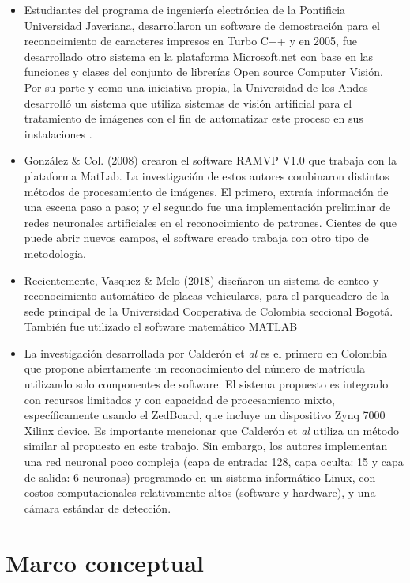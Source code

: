 \begin{itemize}
    \item Estudiantes del programa de ingeniería electrónica de la Pontificia Universidad Javeriana, desarrollaron un software de demostración para el reconocimiento de caracteres impresos en Turbo C++ \cite{TrabajodeGrado2}y en 2005, fue desarrollado otro sistema en la plataforma Microsoft.net con base en las funciones y clases del conjunto de librerías Open source Computer Visión\cite{TrabajodeGrado}. Por su parte y como una iniciativa propia, la Universidad de los Andes desarrolló un sistema que utiliza sistemas de visión artificial para el tratamiento de imágenes con el fin de automatizar este proceso en sus instalaciones \cite{Uniandes}.
    \item González \& Col. (2008) crearon el software RAMVP V1.0 que trabaja con la plataforma MatLab. La investigación de estos autores combinaron distintos métodos de procesamiento de imágenes. El primero, extraía información de una escena paso a paso; y el segundo fue  una implementación preliminar de redes neuronales artificiales en el reconocimiento de patrones. Cientes de que puede abrir nuevos campos, el software creado trabaja con otro tipo de metodología\cite{trabajodegrado3}.
    \item Recientemente, Vasquez \& Melo (2018) diseñaron un sistema de conteo y reconocimiento automático de placas vehiculares, para el parqueadero de la sede principal de la Universidad Cooperativa de Colombia seccional Bogotá. También fue utilizado el software matemático MATLAB\cite{melo2019sistema}
    \item La investigación desarrollada por Calderón et \textit{al}\cite{Calderon2017} es el primero  en Colombia que propone abiertamente un reconocimiento del número de matrícula utilizando solo componentes de software. El sistema propuesto es integrado con recursos limitados y con capacidad de procesamiento mixto, específicamente usando el ZedBoard, que incluye un dispositivo Zynq 7000 Xilinx device. Es importante mencionar que Calderón et \textit{al}  \cite{Calderon2017} utiliza un método similar al propuesto en este trabajo. Sin embargo, los autores implementan una red neuronal poco compleja (capa de entrada: 128, capa oculta: 15 y capa de salida: 6 neuronas) programado en un sistema informático Linux, con costos computacionales relativamente altos (software y hardware), y una cámara estándar de detección.
\end{itemize}

\section{Marco conceptual}

